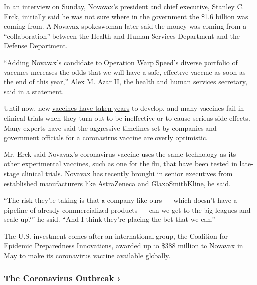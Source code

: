 In an interview on Sunday, Novavax's president and chief executive,
Stanley C. Erck, initially said he was not sure where in the government
the \$1.6 billion was coming from. A Novavax spokeswoman later said the
money was coming from a ``collaboration'' between the Health and Human
Services Department and the Defense Department.

``Adding Novavax's candidate to Operation Warp Speed's diverse portfolio
of vaccines increases the odds that we will have a safe, effective
vaccine as soon as the end of this year,'' Alex M. Azar II, the health
and human services secretary, said in a statement.

Until now, new
\href{https://www.nytimes3xbfgragh.onion/interactive/2020/04/30/opinion/coronavirus-covid-vaccine.html}{vaccines
have taken years} to develop, and many vaccines fail in clinical trials
when they turn out to be ineffective or to cause serious side effects.
Many experts have said the aggressive timelines set by companies and
government officials for a coronavirus vaccine are
\href{https://www.nytimes3xbfgragh.onion/2020/06/08/opinion/trump-coronavirus-vaccine.html}{overly
optimistic}.

Mr. Erck said Novavax's coronavirus vaccine uses the same technology as
its other experimental vaccines, such as one for the flu,
\href{https://novavax.com/our-pipeline}{that have been tested} in
late-stage clinical trials. Novavax has recently brought in senior
executives from established manufacturers like AstraZeneca and
GlaxoSmithKline, he said.

``The risk they're taking is that a company like ours --- which doesn't
have a pipeline of already commercialized products --- can we get to the
big leagues and scale up?'' he said. ``And I think they're placing the
bet that we can.''

The U.S. investment comes after an international group, the Coalition
for Epidemic Preparedness Innovations,
\href{https://ir.novavax.com/news-releases/news-release-details/novavax-receive-388-million-funding-cepi-covid-19-vaccine}{awarded
up to \$388 million to Novavax} in May to make its coronavirus vaccine
available globally.

\href{https://www.nytimes3xbfgragh.onion/news-event/coronavirus?action=click\&pgtype=Article\&state=default\&region=MAIN_CONTENT_3\&context=storylines_faq}{}

\hypertarget{the-coronavirus-outbreak-}{%
\subsubsection{The Coronavirus Outbreak
›}\label{the-coronavirus-outbreak-}}

